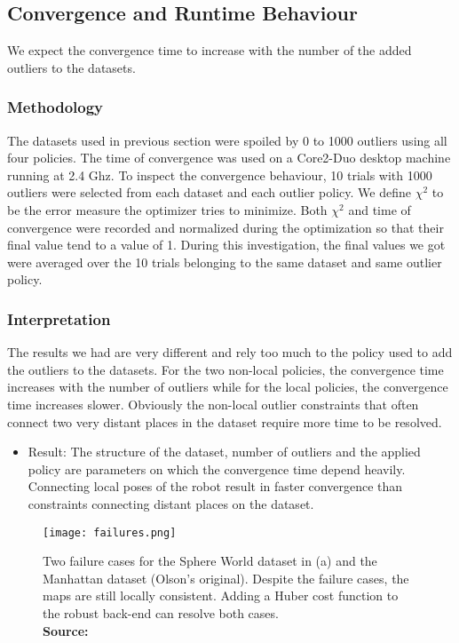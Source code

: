 \documentclass[9pt,technote]{IEEEtran}
\newcommand*{\captionsource}[2]{%
  \caption[{#1}]{%
    #1%
    \\\hspace{\linewidth}%
    \textbf{Source:} #2%
  }%
}
\begin{document}
\subsection{Convergence and Runtime Behaviour}
We expect the convergence time to increase with the number of the added outliers to the datasets. \\ 
\subsubsection{Methodology}
The datasets used in previous section were spoiled by 0 to 1000 outliers using all four policies. The time of convergence was used on a Core2-Duo desktop machine running at 2.4 Ghz.
To inspect the convergence behaviour, 10 trials with 1000 outliers were selected from each dataset and each outlier policy. We define $\chi^2$ to be the error measure the optimizer tries to minimize.
Both $\chi^2$ and time of convergence were recorded and normalized during the optimization so that their final value tend to a value of 1. During this investigation, the final values we got were averaged over the 10 trials belonging to the same dataset and same outlier policy.\\
\subsubsection{Interpretation}
The results we had are very different and rely too much to the policy used to add the outliers to the datasets.
For the two non-local policies, the convergence time increases with the number of outliers while for the local policies, the convergence time increases slower.
Obviously the non-local outlier constraints that often connect two very distant places in the dataset require more time to be resolved.
\begin{itemize}
\item 
Result: The structure of the dataset, number of outliers and the applied policy are parameters on which the convergence time depend heavily. 
Connecting local poses of the robot result in faster convergence than constraints connecting distant places on the dataset.
\end{itemize}
\begin{figure}
[h!]
\centering
\texttt{[image: failures.png]}
\captionsource{Two failure cases for the Sphere World dataset in (a) and the Manhattan dataset (Olson’s original). Despite the failure cases, the maps are still locally consistent. Adding a Huber cost function to the robust back-end can resolve both cases.}{\cite{sunderhauf2012switchable}}
\end{figure}
\end{document}
